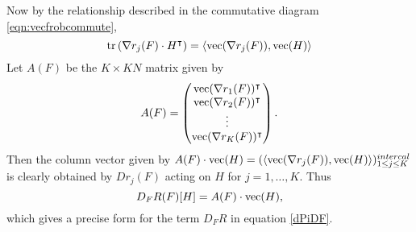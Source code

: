 Now by the relationship described in the commutative diagram \eqref{eqn:vecfrobcommute},
\begin{equation}\label{eqn:vecdrjdF}
\operatorname{tr}\left(\nabla r_j(F)\cdot H^{\intercal}\right) = \langle\operatorname{vec}(\nabla r_j(F)),\operatorname{vec}(H)\rangle
\end{equation}
Let \( A(F) \) be the \( K\times KN \) matrix given by 
\begin{equation}\label{eqn:DRmatrix}
A(F) = \begin{pmatrix}
\operatorname{vec}(\nabla r_1(F))^{\intercal}\\
\operatorname{vec}(\nabla r_2(F))^{\intercal}\\
\vdots\\
\operatorname{vec}(\nabla r_K(F))^{\intercal}
\end{pmatrix}.
\end{equation}
Then the column vector given by \( A(F)\cdot\operatorname{vec}(H) = (\langle\operatorname{vec}(\nabla r_j(F)),\operatorname{vec}(H)\rangle)_{1\leq j\leq K}^{intercal} \) is clearly obtained by \( Dr_j(F) \) acting on \( H \) for \( j=1,\ldots,K \).
Thus
\begin{equation}\label{eqn:dRdFformula}
D_FR(F)[H]=A(F)\cdot\operatorname{vec}(H),
\end{equation}
which gives a precise form for the term $\displaystyle D_FR$ in equation \ref{dPiDF}.